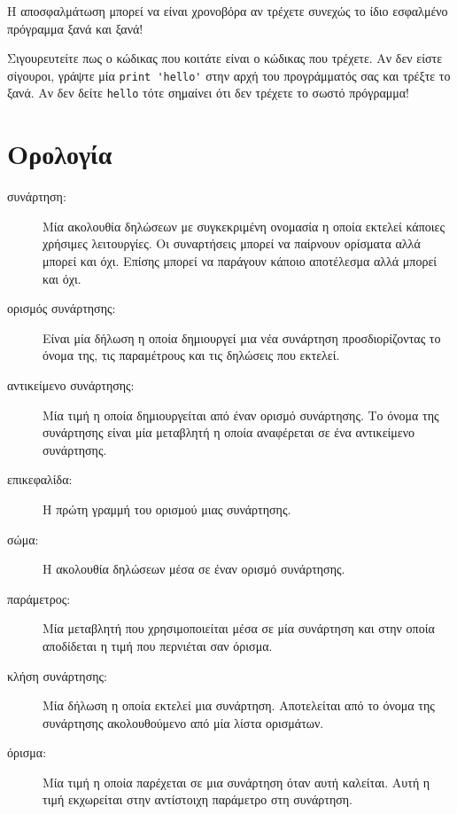 \documentclass[10pt]{book}
\begin{document}
Η αποσφαλμάτωση μπορεί να είναι χρονοβόρα αν τρέχετε συνεχώς το ίδιο 
εσφαλμένο πρόγραμμα ξανά και ξανά!

Σιγουρευτείτε πως ο κώδικας που κοιτάτε είναι ο κώδικας που τρέχετε.
Αν δεν είστε σίγουροι, γράψτε μία \verb"print 'hello'" 
στην αρχή του προγράμματός σας και τρέξτε το ξανά. Αν δεν δείτε  
\verb"hello" τότε σημαίνει ότι δεν τρέχετε το σωστό πρόγραμμα!



\section{Ορολογία}

\begin{description}

\item[συνάρτηση:] Μία ακολουθία δηλώσεων με συγκεκριμένη ονομασία η οποία εκτελεί κάποιες
χρήσιμες λειτουργίες. Οι συναρτήσεις μπορεί να παίρνουν ορίσματα αλλά μπορεί και όχι.
Επίσης μπορεί να παράγουν κάποιο αποτέλεσμα αλλά μπορεί και όχι.

\item[ορισμός συνάρτησης:] Είναι μία δήλωση η οποία δημιουργεί μια νέα συνάρτηση 
προσδιορίζοντας το όνομα της, τις παραμέτρους και τις δηλώσεις που εκτελεί.

\item[αντικείμενο συνάρτησης:] Μία τιμή η οποία δημιουργείται από έναν ορισμό συνάρτησης.
Το όνομα της συνάρτησης είναι μία μεταβλητή η οποία αναφέρεται σε ένα αντικείμενο
συνάρτησης.

\item[επικεφαλίδα:] Η πρώτη γραμμή του ορισμού μιας συνάρτησης.

\item[σώμα:] Η ακολουθία δηλώσεων μέσα σε έναν ορισμό συνάρτησης.

\item[παράμετρος:] Μία μεταβλητή που χρησιμοποιείται μέσα σε μία συνάρτηση και 
στην οποία αποδίδεται η τιμή που περνιέται σαν όρισμα.

\item[κλήση συνάρτησης:] Μία δήλωση η οποία εκτελεί μια συνάρτηση. Αποτελείται από το
όνομα της συνάρτησης ακολουθούμενο από μία λίστα ορισμάτων.

\item[όρισμα:] Μία τιμή η οποία παρέχεται σε μια συνάρτηση όταν αυτή καλείται.
Αυτή η τιμή εκχωρείται στην αντίστοιχη παράμετρο στη συνάρτηση.


\end{description}
\end{document}
